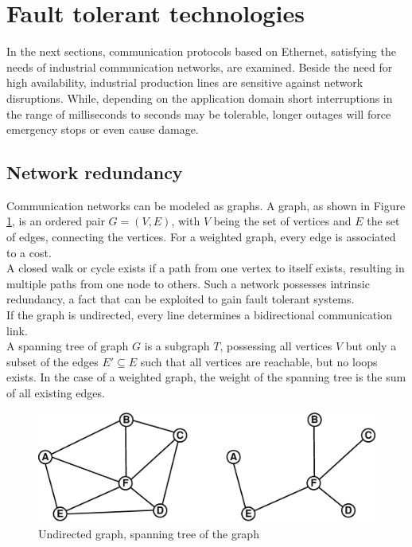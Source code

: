 \section{Fault tolerant technologies}
In the next sections, communication protocols based on Ethernet, satisfying the needs of industrial communication networks, are examined. Beside the need for high availability,
industrial production lines
are sensitive against network disruptions. While, depending on the application domain short interruptions in the range of milliseconds to seconds may be
tolerable, longer outages will force emergency stops or even cause damage.

\subsection{Network redundancy}

Communication networks can be modeled as graphs. A graph, as shown in Figure \ref{fig:graph}, is an ordered pair $G=(V,E)$, with $V$ being the set of vertices and $E$
the set of edges, connecting the vertices. For a weighted graph, every edge is associated to a cost. 
\\
A closed walk or cycle exists if a path from one vertex to itself exists, resulting in multiple paths from one node to others.
Such a network possesses intrinsic redundancy, a fact that can be exploited to gain fault tolerant systems.
\\
If the graph is undirected, every line determines a bidirectional communication link. 
\\
A spanning tree of graph $G$ is a subgraph $T$, possessing all vertices $V$ but only a subset of the edges $E' \subseteq E$ such that all vertices are reachable,
but no loops exists. In the case of a weighted graph, the weight of the spanning tree is the sum of all existing edges.
\begin{figure}[H]
\centering
 \includegraphics[width=0.8\linewidth]{figures/graph.eps}
 \caption{Undirected graph, spanning tree of the graph}
\label{fig:graph}
\end{figure}

